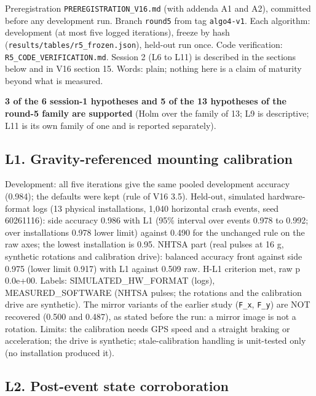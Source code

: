 


Preregistration \texttt{PREREGISTRATION\_V16.md} (with addenda A1 and A2), committed before any development run. Branch \texttt{round5} from tag \texttt{algo4-v1}. Each algorithm: development (at most five logged iterations), freeze by hash (\texttt{results/tables/r5\_frozen.json}), held-out run once. Code verification: \texttt{R5\_CODE\_VERIFICATION.md}. Session 2 (L6 to L11) is described in the sections below and in V16 section 15. Words: plain; nothing here is a claim of maturity beyond what is measured.

\textbf{3 of the 6 session-1 hypotheses and 5 of the 13 hypotheses of the round-5 family are supported} (Holm over the family of 13; L9 is descriptive; L11 is its own family of one and is reported separately).

\subsection*{L1. Gravity-referenced mounting calibration}

Development: all five iterations give the same pooled development accuracy (0.984); the defaults were kept (rule of V16 3.5). Held-out, simulated hardware-format logs (13 physical installations, 1,040 horizontal crash events, seed 60261116): side accuracy 0.986 with L1 (95\% interval over events 0.978 to 0.992; over installations 0.978 lower limit) against 0.490 for the unchanged rule on the raw axes; the lowest installation is 0.95. NHTSA part (real pulses at 16 g, synthetic rotations and calibration drive): balanced accuracy front against side 0.975 (lower limit 0.917) with L1 against 0.509 raw. H-L1 criterion met, raw p 0.0e+00. Labels: SIMULATED\_HW\_FORMAT (logs), MEASURED\_SOFTWARE (NHTSA pulses; the rotations and the calibration drive are synthetic). The mirror variants of the earlier study (\texttt{F\_x}, \texttt{F\_y}) are NOT recovered (0.500 and 0.487), as stated before the run: a mirror image is not a rotation. Limits: the calibration needs GPS speed and a straight braking or acceleration; the drive is synthetic; stale-calibration handling is unit-tested only (no installation produced it).

\subsection*{L2. Post-event state corroboration}


